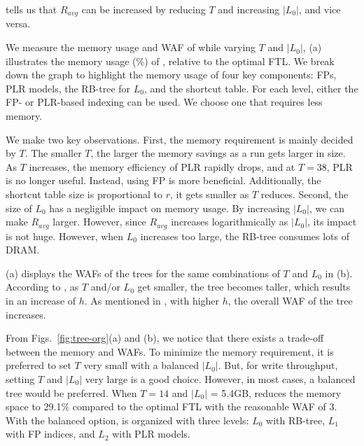  tells us that $R_{avg}$ can be increased 
by reducing $T$ and increasing $|L_0|$, and vice versa.

We measure the memory usage
and WAF of \ours{} while varying $T$ and $|L_0|$,
(a) illustrates the memory usage (\%) of
\ourtree{}, relative to the optimal FTL.
We break down the graph to highlight
the memory usage of four key components:
FPs, PLR models, the RB-tree for $L_0$, 
and the shortcut table.  
For each level, either the FP- or
PLR-based indexing can be used.  We choose one that requires less memory.  

We
make two key observations.  First, the memory requirement 
is mainly decided by $T$.  The smaller $T$, the larger the memory
savings as a run gets larger in size.
As $T$ increases, the memory efficiency of PLR rapidly drops, and
at $T=38$, PLR is no longer useful. %
Instead, using FP is more beneficial.  Additionally, 
the shortcut table size is proportional to $r$, 
it gets smaller as $T$ reduces.
Second, the size of $L_0$ has a negligible impact on memory
usage. By increasing $|L_0|$, we can make 
$R_{avg}$ larger.
However, since $R_{avg}$ increases logarithmically as $|L_0|$,
its impact is not huge.
However, when $L_0$ increases too large, 
the RB-tree consumes lots of DRAM.

(a) displays the WAFs of the trees for the same combinations
of $T$ and $L_0$ in (b).  
According to ,
as $T$ and/or $L_0$ get smaller, the tree becomes taller,
which results in an increase of $h$.
As mentioned in , with higher $h$, 
the overall WAF of the tree increases.

From Figs.~\ref{fig:tree-org}(a) and (b), we notice that there exists a
trade-off between the memory and WAFs.  To minimize the memory requirement, it
is preferred to set $T$ very small with a balanced $|L_0|$.  
But, for write throughput, 
setting $T$ and $|L_0|$ very large is a good choice.
However, in most cases, a balanced tree would be preferred.  
When $T=14$ and $|L_0|$ = 5.4GB, \ourtree{} reduces the memory
space to 29.1\% compared to the optimal FTL 
with the reasonable WAF of 3.  With the balanced option,
\ours{} is organized with three levels: 
$L_0$ with RB-tree, $L_1$ with FP indices, and $L_2$ with PLR models.

